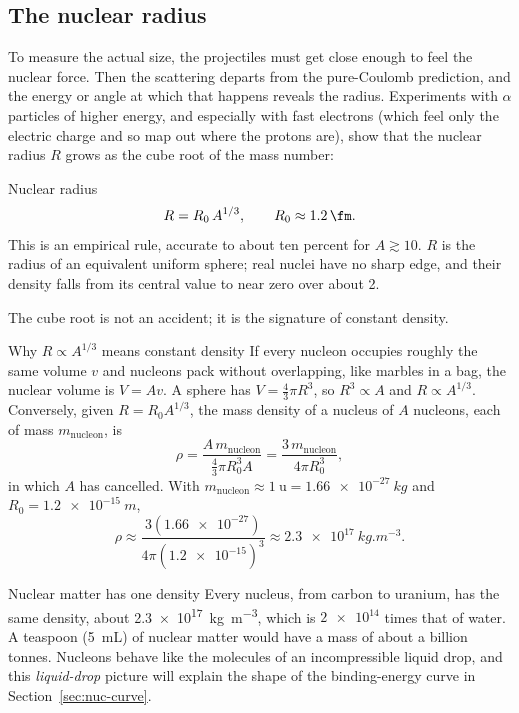 \subsection{The nuclear radius}
To measure the actual size, the projectiles must get close enough to feel the nuclear force. Then the
scattering departs from the pure-Coulomb prediction, and the energy or angle at which that happens reveals
the radius. Experiments with $\alpha$ particles of higher energy, and especially with fast electrons
(which feel only the electric charge and so map out where the protons are), show that the nuclear
radius $R$ grows as the cube root of the mass number:
\begin{keybox}{Nuclear radius}
\begin{equation}\label{eq:nuc-radius}
R = R_0\,A^{1/3},\qquad R_0\approx\SI{1.2}{\fm}.
\end{equation}
This is an empirical rule, accurate to about ten percent for $A\gtrsim10$. $R$ is the radius of an
equivalent uniform sphere; real nuclei have no sharp edge, and their density falls from its central
value to near zero over about \SI{2}{\fm}.
\end{keybox}
The cube root is not an accident; it is the signature of constant density.

\begin{derivbox}{Why \texorpdfstring{$R\propto A^{1/3}$}{R proportional to A to the 1/3} means constant density}
If every nucleon occupies roughly the same volume $v$ and nucleons pack without overlapping, like marbles
in a bag, the nuclear volume is $V=Av$. A sphere has $V=\tfrac43\pi R^3$, so $R^3\propto A$ and
$R\propto A^{1/3}$. Conversely, given $R=R_0A^{1/3}$, the mass density of a nucleus of $A$ nucleons, each
of mass $m_{\text{nucleon}}$, is
\[
\rho=\frac{A\,m_{\text{nucleon}}}{\tfrac43\pi R_0^3A}=\frac{3\,m_{\text{nucleon}}}{4\pi R_0^3},
\]
in which $A$ has cancelled. With $m_{\text{nucleon}}\approx\SI{1}{\amu}=\SI{1.66e-27}{kg}$ and
$R_0=\SI{1.2e-15}{m}$,
\[
\rho\approx\frac{3(\num{1.66e-27})}{4\pi(\num{1.2e-15})^3}\approx\SI{2.3e17}{kg.m^{-3}}.
\]
\end{derivbox}

\begin{keybox}{Nuclear matter has one density}
Every nucleus, from carbon to uranium, has the same density, about \SI{2.3e17}{kg.m^{-3}}, which is
$\num{2e14}$ times that of water. A teaspoon (\SI{5}{mL}) of nuclear matter would have a mass of about a
billion tonnes. Nucleons behave like the molecules of an incompressible liquid drop, and this
\emph{liquid-drop} picture will explain the shape of the binding-energy curve in
Section~\ref{sec:nuc-curve}.
\end{keybox}

